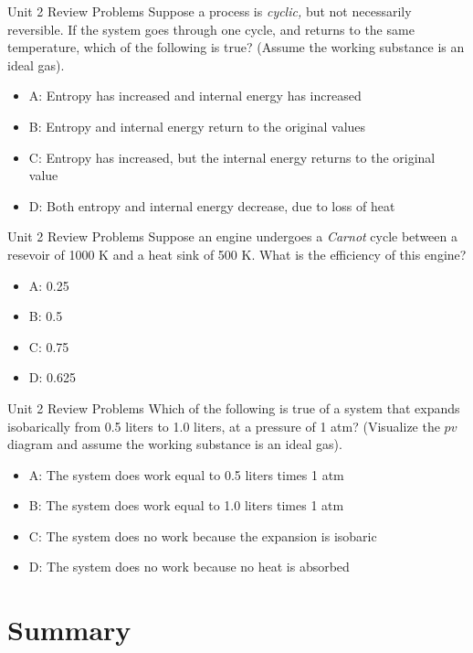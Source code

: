 \documentclass{beamer}
\begin{document}
\begin{frame}{Unit 2 Review Problems}
Suppose a process is \textit{cyclic,} but not necessarily reversible.  If the system goes through one cycle, and returns to the same temperature, which of the following is true? (Assume the working substance is an ideal gas).
\begin{itemize}
\item A: Entropy has increased and internal energy has increased
\item B: Entropy and internal energy return to the original values
\item C: Entropy has increased, but the internal energy returns to the original value
\item D: Both entropy and internal energy decrease, due to loss of heat
\end{itemize}
\end{frame}

\begin{frame}{Unit 2 Review Problems}
Suppose an engine undergoes a \textit{Carnot} cycle between a resevoir of 1000 K and a heat sink of 500 K.  What is the efficiency of this engine?
\begin{itemize}
\item A: 0.25
\item B: 0.5
\item C: 0.75
\item D: 0.625
\end{itemize}
\end{frame}

\begin{frame}{Unit 2 Review Problems}
Which of the following is true of a system that expands isobarically from 0.5 liters to 1.0 liters, at a pressure of 1 atm? (Visualize the $pv$ diagram and assume the working substance is an ideal gas).
\begin{itemize}
\item A: The system does work equal to 0.5 liters times 1 atm
\item B: The system does work equal to 1.0 liters times 1 atm
\item C: The system does no work because the expansion is isobaric
\item D: The system does no work because no heat is absorbed
\end{itemize}
\end{frame}

\section{Summary}
\end{document}
